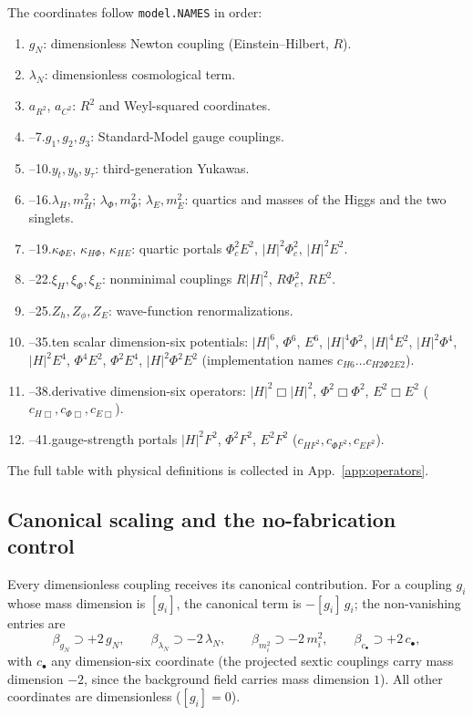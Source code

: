 \documentclass[11pt]{article}
\begin{document}
The coordinates follow \texttt{model.NAMES} in order:
\begin{enumerate}[label=\arabic*.]
  \item $g_N$: dimensionless Newton coupling (Einstein--Hilbert, $R$).
  \item $\lambda_N$: dimensionless cosmological term.
  \item $a_{R^2}$, $a_{C^2}$: $R^2$ and Weyl-squared coordinates.
  \item--7.\quad $g_1,g_2,g_3$: Standard-Model gauge couplings.
  \item--10.\quad $y_t,y_b,y_\tau$: third-generation Yukawas.
  \item--16.\quad $\lambda_H,m_H^2$; $\lambda_\Phi,m_\Phi^2$; $\lambda_E,m_E^2$:
        quartics and masses of the Higgs and the two singlets.
  \item--19.\quad $\kappa_{\Phi E}$, $\kappa_{H\Phi}$, $\kappa_{HE}$:
        quartic portals $\Phi_c^2E^2$, $|H|^2\Phi_c^2$, $|H|^2E^2$.
  \item--22.\quad $\xi_H,\xi_\Phi,\xi_E$: nonminimal couplings
        $R|H|^2$, $R\Phi_c^2$, $R E^2$.
  \item--25.\quad $Z_h,Z_\phi,Z_E$: wave-function renormalizations.
  \item--35.\quad ten scalar dimension-six potentials: $|H|^6$, $\Phi^6$,
        $E^6$, $|H|^4\Phi^2$, $|H|^4E^2$, $|H|^2\Phi^4$, $|H|^2E^4$,
        $\Phi^4E^2$, $\Phi^2E^4$, $|H|^2\Phi^2E^2$ (implementation names
        $c_{H6}\ldots c_{H2\Phi2E2}$).
  \item--38.\quad derivative dimension-six operators: $|H|^2\Box|H|^2$,
        $\Phi^2\Box\Phi^2$, $E^2\Box E^2$ ($c_{H\Box},c_{\Phi\Box},c_{E\Box}$).
  \item--41.\quad gauge-strength portals $|H|^2F^2$, $\Phi^2F^2$, $E^2F^2$
        ($c_{HF^2},c_{\Phi F^2},c_{EF^2}$).
\end{enumerate}
The full table with physical definitions is collected in
App.~\ref{app:operators}.

\subsection{Canonical scaling and the no-fabrication control}
\label{sec:canonical}

Every dimensionless coupling receives its canonical contribution.  For a
coupling $g_i$ whose mass dimension is $[g_i]$, the canonical term is
$- [g_i]\, g_i$; the non-vanishing entries are
\begin{equation}
  \label{eq:canonical}
  \beta_{g_N}\supset +2\,g_N,\qquad
  \beta_{\lambda_N}\supset -2\,\lambda_N,\qquad
  \beta_{m_i^2}\supset -2\,m_i^2,\qquad
  \beta_{c_\bullet}\supset +2\,c_\bullet ,
\end{equation}
with $c_\bullet$ any dimension-six coordinate (the projected sextic
couplings carry mass dimension $-2$, since the background field carries mass
dimension $1$).  All other coordinates are dimensionless ($[g_i]=0$).
\end{document}
